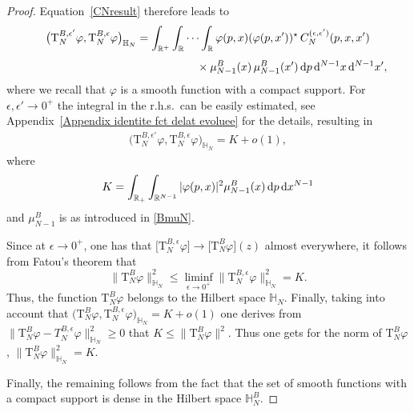 \documentclass[pdftex]{sigma}%
\numberwithin{equation}{section}
\begin{document}
\begin{proof}
Equation~\eqref{CNresult} therefore leads to
\begin{gather*}
\big( \mathrm T_{N}^{B,\epsilon'} \varphi , \mathrm T_{N}^{B,\epsilon} \varphi \big)_{\mathbb H_N}
 =\int_{\mathbb R^+} \int_{\mathbb R}\cdots \int_{\mathbb R}
\varphi(p, x)(\varphi(p, x'))^\star \,
C_N^{( \epsilon, \epsilon')}(p, x, x')
\\[1ex] \hphantom{\big( \mathrm T_{N}^{B,\epsilon'} \varphi , \mathrm T_{N}^{B,\epsilon} \varphi \big)_{\mathbb H_N}
 =\int_{\mathbb R^+} \int_{\mathbb R}\cdots \int_{\mathbb R}}
{}\times \mu_{N-1}^{B}( x) \, \mu_{N-1}^{B}( x') \, {\rm d}p\, {\rm d}^{N-1} x\, {\rm d}^{N-1} x',
\end{gather*}
where we recall that $ \varphi$ is a smooth function with a compact support. For $ \epsilon,\epsilon'\to 0^+$ the integral in the r.h.s.\ can
be easily estimated, see Appendix~\ref{Appendix identite fct delat evoluee} for the details, resulting in
\begin{gather*}
\big( \mathrm T_{N}^{B,\epsilon'} \varphi , \mathrm T_{N}^{B,\epsilon} \varphi \big)_{\mathbb H_N}= K+ o(1),
\end{gather*}
where
\begin{gather*}
K=\int_{\mathbb R_+}\int_{\mathbb R^{N-1}}
 |\varphi(p, x)|^2 \mu_{N-1}^B( x) \,{\rm d}p \, {\rm d}x ^{N-1}
\end{gather*}
and $\mu_{N-1}^{B}$ is as introduced in \eqref{BmuN}.

Since at $ \epsilon\to 0^+$, one has that $\big[ \mathrm T_{N}^{B,\epsilon}\varphi\big] \rightarrow \big[ \mathrm T_{N}^{B}\varphi\big]( z)$ almost
everywhere, it follows from Fatou's theorem that
\[
\big\| \mathrm T_{N}^{B}\varphi \big\|^2_{\mathbb H_N} \leq \liminf_{ \epsilon\to 0^+}\big\|\mathrm T_{N}^{B,\epsilon}\varphi\big\|^2_{\mathbb H_N} =K.
\]
Thus, the function $\mathrm T_{N}^{B}\varphi$ belongs to the Hilbert space $\mathbb H_N$.
Finally, taking into account that
$\big(\mathrm T_{N}^{B}\varphi,\mathrm T_{N}^{B,\epsilon}\varphi\big)_{\mathbb H_N}=K+o(1)$
one derives from $\big\|\mathrm T_{N}^{B}\varphi -T_{N}^{B,\epsilon}\varphi\big\|^2_{\mathbb H_N}\geq0$ that
$ K\leq\big\|\mathrm T_{N}^{B}\varphi\big\|^2 $. Thus one gets for the norm of $\mathrm T_{N}^{B}\varphi$,
$\big\|\mathrm T_{N}^{B}\varphi\big\|^2_{\mathbb H_N}=K.$

Finally, the remaining follows from the fact that the set of smooth functions with a compact support is dense in the Hilbert space $\mathbb H_N^{B}$.
\end{proof}
\end{document}
